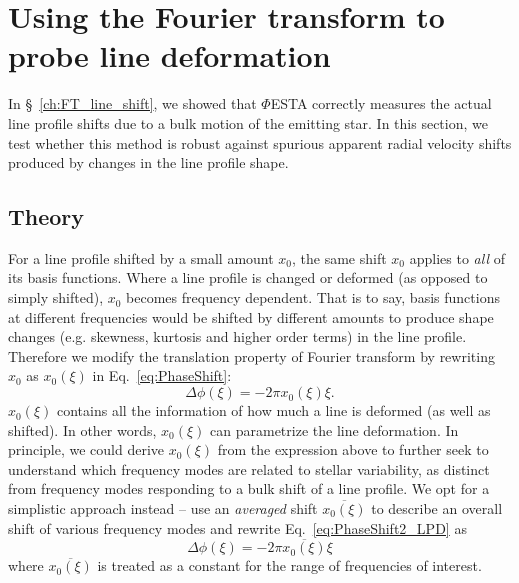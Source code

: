 \section{Using the Fourier transform to probe line deformation}
\label{\thesection}
\label{sec:FT_ld}

In \S~\ref{ch:FT_line_shift}, we showed that $\mathit{\Phi}$ESTA correctly measures the actual line profile shifts due to a bulk motion of the emitting star. In this section, we test whether this method is robust against spurious apparent radial velocity shifts produced by changes in the line profile shape.


\subsection{Theory}
\label{sec:LD_Theory}

For a line profile shifted by a small amount $x_0$, the same shift $x_0$ applies to \textit{all} of its basis functions. Where a line profile is changed or deformed (as opposed to simply shifted), $x_0$ becomes frequency dependent. That is to say, basis functions at different frequencies would be shifted by different amounts to produce shape changes (e.g. skewness, kurtosis and higher order terms) in the line profile. Therefore we modify the translation property of Fourier transform by rewriting $x_0$ as $x_0(\xi)$ in Eq.~\ref{eq:PhaseShift}:
\begin{equation}
	\Delta \phi(\xi) = -2 \pi x_0(\xi) \xi.
\label{eq:PhaseShift2_LPD}
\end{equation}
$x_0(\xi)$ contains all the information of how much a line is deformed (as well as shifted). In other words, $x_0(\xi)$ can parametrize the line deformation. In principle, we could derive $x_0(\xi)$ from the expression above to further seek to understand which frequency modes are related to stellar variability, as distinct from frequency modes responding to a bulk shift of a line profile. We opt for a simplistic approach instead -- use an \textit{averaged} shift $\overline{x_0(\xi)}$ to describe an overall shift of various frequency modes and rewrite Eq.~\ref{eq:PhaseShift2_LPD} as 
\begin{equation}
	\Delta \phi(\xi) = -2 \pi \overline{x_0(\xi)} \xi
\label{eq:PhaseShift2_LPD_ave}
\end{equation}
where $\overline{x_0(\xi)}$ is treated as a constant for the range of frequencies of interest. 

